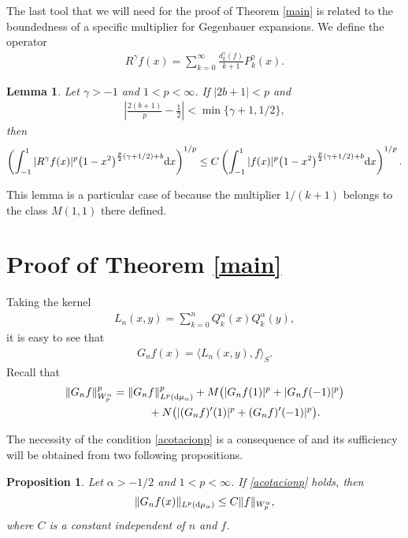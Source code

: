 \documentclass[pdftex]{sigma}
\newtheorem{lem}[thm]{Lemma}
\newtheorem{propo}[thm]{Proposition}
\numberwithin{equation}{section}
\begin{document}
The last tool that we will need for the proof of Theorem \ref{main} is related to the boundedness of a specific multiplier for Gegenbauer expansions. We define the operator
\begin{gather*}
R^\gamma f(x)=\sum_{k=0}^\infty \frac{d_k^\gamma(f)}{k+1}P_{k}^\gamma(x).
\end{gather*}
\begin{lem}\label{lem:muck}
Let $\gamma>-1$ and $1<p<\infty$. If $|2b+1|<p$ and
\begin{gather*}
\left|\frac{2(b+1)}{p}-\frac{1}{2}\right|<\min\{\gamma+1,1/2\},
\end{gather*}
then	
	\begin{gather*}%
	\left(\int_{-1}^{1}|R^\gamma f(x)|^p\big(1-x^2\big)^{\frac{p}{2}(\gamma+1/2)+b} {\rm d}x\right)^{1/p} \le C\left(\int_{-1}^{1}|f(x)|^p\big(1-x^2\big)^{\frac{p}{2}(\gamma+1/2)+b} {\rm d}x\right)^{1/p}.
	\end{gather*}
\end{lem}

This lemma is a particular case of \cite[Theorem~1.10]{muckenhoupt} because the multiplier $1/(k+1)$ belongs to the class $M(1,1)$ there defined.

\section{Proof of Theorem \ref{main}}\label{section3}
Taking the kernel
\begin{gather*}
L_n(x,y)=\sum_{k=0}^n Q_k^{\alpha}(x)Q_k^{\alpha}(y),
\end{gather*}
it is easy to see that
\begin{gather*}
G_nf(x)=\langle L_n(x,y),f\rangle_S.
\end{gather*}
Recall that
\begin{gather*}
\|G_nf\|_{W_p^{\alpha}}^p=\|G_nf\|_{L^p({\rm d}\mu_{\alpha})}^p+M\big(|G_nf(1)|^p+|G_nf(-1)|^p\big)\\
\hphantom{\|G_nf\|_{W_p^{\alpha}}^p=}{} +N\big(|(G_nf)'(1)|^p+(G_nf)'(-1)|^p\big).
\end{gather*}

The necessity of the condition \eqref{acotacionp} is a consequence of \cite[Theorem 1]{Fejzullahu} and its sufficiency will be obtained from two following propositions.
\begin{propo}\label{prop1} Let $\alpha>-1/2$ and $1<p<\infty$. If \eqref{acotacionp} holds, then
	\begin{gather}\label{des-1}
	\|G_nf(x)\|_{L^p({\rm d}\mu_{\alpha})}\le C\|f\|_{{W_p^{\alpha}}},
	\end{gather}
where $C$ is a constant independent of $n$ and $f$.
\end{propo}
\end{document}
